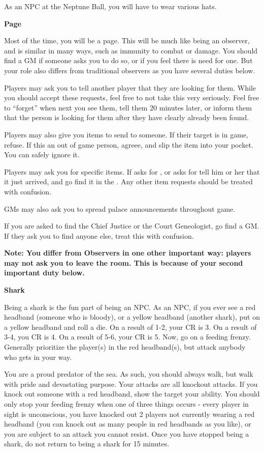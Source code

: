 \documentclass[green]{NeptuneBall}
\begin{document}
\name{\gNPC{}}

As an NPC at the Neptune Ball, you will have to wear various hats.

{\bf Page}

Most of the time, you will be a page. This will be much like being an observer, and is similar in many ways, such as immunity to combat or damage. You should find a GM if someone asks you to do so, or if you feel there is need for one. But your role also differs from traditional observers as you have several duties below.

Players may ask you to tell another player that they are looking for them. While you should accept these requests, feel free to not take this very seriously. Feel free to "`forget"' when next you see them, tell them 20 minutes later, or inform them that the person is looking for them after they have clearly already been found. 

Players may also give you items to send to someone. If their target is in game, refuse. If this an out of game person, agreee, and slip the item into your pocket. You can safely ignore it.

Players may ask you for specific items. If \cPriest{} asks for \iCipherLetter{}, or \cSpy{} asks for \iScroll{} tell him or her that it just arrived, and go find it in the \pGM{}. Any other item requests should be treated with confusion.

GMs may also ask you to spread palace announcements throughout game.

If you are asked to find the Chief Justice or the Court Geneologist, go find a GM. If they ask you to find anyone else, treat this with confusion.

{\bf Note: You differ from Observers in one other important way: players may not ask you to leave the room. This is because of your second important duty below.}

{\bf Shark}

Being a shark is the fun part of being an NPC. As an NPC, if you ever see a red headband (someone who is bloody), or a yellow headband (another shark), put on a yellow headband and roll a die. On a result of 1-2, your CR is 3. On a result of 3-4, you CR is 4. On a result of 5-6, your CR is 5. Now, go on a feeding frenzy. Generally prioritize the player(s) in the red headband(s), but attack anybody who gets in your way. 

You are a proud predator of the sea. As such, you should always walk, but walk with pride and devastating purpose. Your attacks are all knockout attacks. If you knock out someone with a red headband, show the target your \aShark{} ability. You should only stop your feeding frenzy when one of three things occurs - every player in sight is unconscious, you have knocked out 2 players not currently wearing a red headband (you can knock out as many people in red headbands as you like), or you are subject to an attack you cannot resist. Once you have stopped being a shark, do not return to being a shark for 15 minutes.
\end{document}
